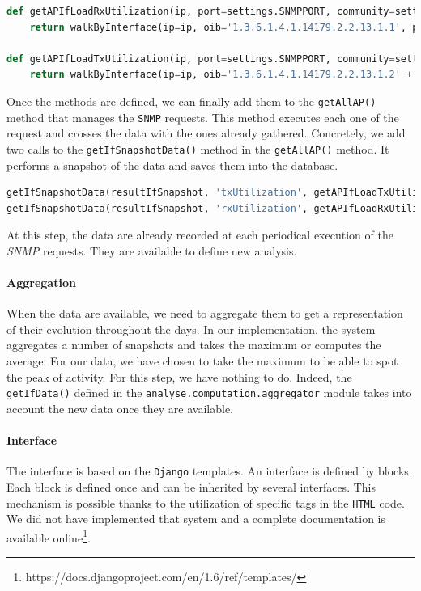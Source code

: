 \begin{lstlisting}[language=Python, frame=single,breaklines=true,caption={Adding the two new methods}]
def getAPIfLoadRxUtilization(ip, port=settings.SNMPPORT, community=settings.SNMPCOMMUNITY, ap=''):
	return walkByInterface(ip=ip, oib='1.3.6.1.4.1.14179.2.2.13.1.1', port=port, community=community)

def getAPIfLoadTxUtilization(ip, port=settings.SNMPPORT, community=settings.SNMPCOMMUNITY, ap=''):
	return walkByInterface(ip=ip, oib='1.3.6.1.4.1.14179.2.2.13.1.2' + ap, port=port, community=community)
\end{lstlisting}

Once the methods are defined, we can finally add them to the \texttt{getAllAP()} method that manages the \texttt{SNMP} requests. This method executes each one of the request and crosses the data with the ones already gathered. Concretely, we add two calls to the \texttt{getIfSnapshotData()} method in the \texttt{getAllAP()} method. It performs a snapshot of the data and saves them into the database.\\

\begin{lstlisting}[language=Python,frame=single,breaklines=true,caption={Adding two calls to \texttt{getIfSnapshotData()}}]
getIfSnapshotData(resultIfSnapshot, 'txUtilization', getAPIfLoadTxUtilization,ip=ip, port=port, community=community)
getIfSnapshotData(resultIfSnapshot, 'rxUtilization', getAPIfLoadRxUtilization,ip=ip, port=port, community=community)
\end{lstlisting}

At this step, the data are already recorded at each periodical execution of the \emph{SNMP} requests. They are available to define new analysis.

\paragraph*{Aggregation} When the data are available, we need to aggregate them to get a representation of their evolution throughout the days. In our implementation, the system aggregates a number of snapshots and takes the maximum or computes the average. For our data, we have chosen to take the maximum to be able to spot the peak of activity. For this step, we have nothing to do. Indeed, the \texttt{getIfData()} defined in the \texttt{analyse.computation.aggregator} module takes into account the new data once they are available.

\paragraph*{Interface} The interface is based on the \texttt{Django} templates. An interface is defined by blocks. Each block is defined once and can be inherited by several interfaces. This mechanism is possible thanks to the utilization of specific tags in the \texttt{HTML} code. We did not have implemented that system and a complete documentation is available online\footnote{https://docs.djangoproject.com/en/1.6/ref/templates/}. 


